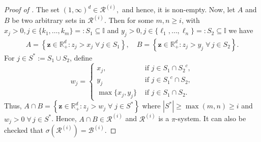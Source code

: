 \documentclass[aos]{imsart}
\numberwithin{equation}{section}
\theoremstyle{plain} %
\theoremstyle{remark}
\newcommand{\R}{\mathbb{R}}
\def\cB{\mathcal{B}}
\def\cR{\mathcal{R}}
\def\bz{\boldsymbol z}
\begin{document}
\begin{proof}[Proof of ]
The set $(1,\infty)^d\in \cR^{(i)},$ and hence, it is non-empty. Now, let $A$ and  $B$ be two arbitrary sets in $\cR^{(i)}$. Then for some $m,n  \ge i$, with $x_{j}>0, j\in \{k_1,\ldots,k_m\}=:S_1 \subseteq \mathbb{I}$ and $y_{j}>0, j\in \{\ell_1,\ldots,\ell_n\}  =:S_2\subseteq \mathbb{I}$ we have
\begin{align*}
A= \left\{\bz\in\R_+^d: z_{j}>x_j\;\forall\, j\in  S_1 \right\}, \quad  B= \left\{\bz\in\R_+^d: z_{j}>y_j\;\forall\, j\in S_2 \right\}.
\end{align*}
For  $j\in S^*:= S_1 \cup S_2$, define $$w_j = \begin{cases} x_j,  & \text{ if } j \in S_1 \cap {S_2}^{c},\\
 y_j & \text{ if } j \in {S_1}^{c} \cap {S_2},\\
  \max\{x_j,y_j\} &\text{ if }  j \in S_1 \cap {S_2}.\end{cases}$$
Thus, $A\cap B = \left\{\bz\in\R_+^d: z_{j}>w_j\;\forall\; j\in  S^* \right\} $ where $|S^*| \ge \max(m,n)\ge i$ and $w_j>0\; \forall\, j \in S^*$. Hence, $A\cap B \in \cR^{(i)}$ and $\cR^{(i)}$ is a $\pi$-system. It can also be checked that  $\sigma(\cR^{(i)})=\cB^{(i)}$.
\end{proof}
\end{document}

